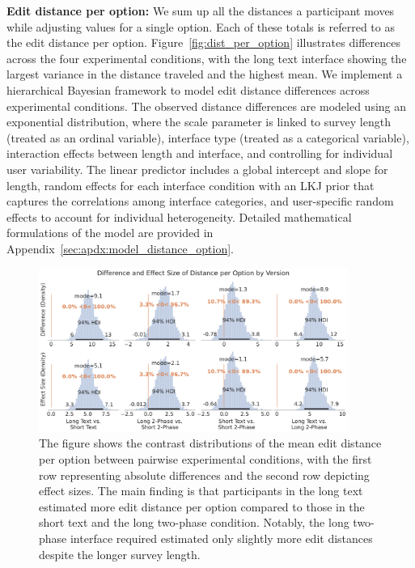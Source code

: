 \textbf{Edit distance per option:} We sum up all the distances a participant moves while adjusting values for a single option. Each of these totals is referred to as the edit distance per option. Figure~\ref{fig:dist_per_option} illustrates differences across the four experimental conditions, with the long text interface showing the largest variance in the distance traveled and the highest mean. We implement a hierarchical Bayesian framework to model edit distance differences across experimental conditions. The observed distance differences are modeled using an exponential distribution, where the scale parameter is linked to survey length (treated as an ordinal variable), interface type (treated as a categorical variable), interaction effects between length and interface, and controlling for individual user variability. The linear predictor includes a global intercept and slope for length, random effects for each interface condition with an LKJ prior that captures the correlations among interface categories, and user-specific random effects to account for individual heterogeneity. Detailed mathematical formulations of the model are provided in Appendix~\ref{sec:apdx:model_distance_option}. 

\begin{figure}[ht]
    \centering
    \includegraphics[width=0.9\textwidth]{content/image/distance/distance_diff_per_option_effect_size_by_version.pdf}
    \caption{The figure shows the contrast distributions of the mean edit distance per option between pairwise experimental conditions, with the first row representing absolute differences and the second row depicting effect sizes. The main finding is that participants in the long text estimated more edit distance per option compared to those in the short text and the long two-phase condition. Notably, the long two-phase interface required estimated only slightly more edit distances despite the longer survey length.}
    \label{fig:dist_per_option_bayesian}
\end{figure}


